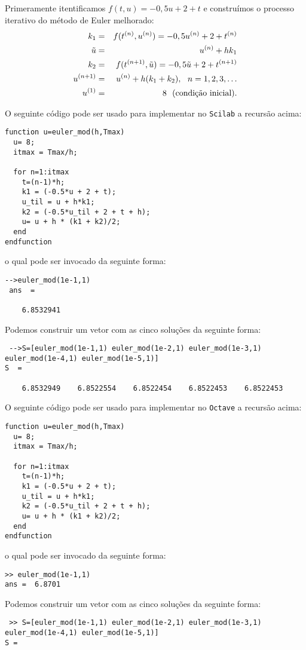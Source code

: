 \begin{resol} Primeramente itentificamos $f(t,u)=-0,5u+2+t$ e construímos o processo iterativo do método de Euler melhorado:
\begin{eqnarray}
  k_1&=&  f(t^{(n)},u^{(n)})=-0,5u^{(n)}+2+t^{(n)}\\
  \tilde{u}&=& u^{(n)} + hk_1\\
  k_2&=&  f(t^{(n+1)},\tilde{u})=-0,5\tilde{u}+2+t^{(n+1)}\\
  u^{(n+1)}&=&u^{(n)} + h( k_1+k_2),~~n=1,2,3,\ldots\\
  u^{(1)}&=&8 ~~ \hbox{\text{(condição inicial)}}.
\end{eqnarray}

\ifisscilab
O seguinte código pode ser usado para implementar no \verb+Scilab+ a recursão acima:
\begin{verbatim}
function u=euler_mod(h,Tmax)
  u= 8;
  itmax = Tmax/h;

  for n=1:itmax
    t=(n-1)*h;
    k1 = (-0.5*u + 2 + t);
    u_til = u + h*k1;
    k2 = (-0.5*u_til + 2 + t + h);
    u= u + h * (k1 + k2)/2;
  end
endfunction
\end{verbatim}
o qual pode ser invocado da seguinte forma:
\begin{verbatim}
-->euler_mod(1e-1,1)
 ans  =

    6.8532941
\end{verbatim}
Podemos construir um vetor com as cinco soluções da seguinte forma:
\begin{verbatim}
 -->S=[euler_mod(1e-1,1) euler_mod(1e-2,1) euler_mod(1e-3,1) euler_mod(1e-4,1) euler_mod(1e-5,1)]
S  =

    6.8532949    6.8522554    6.8522454    6.8522453    6.8522453
 \end{verbatim}
\fi
\ifisoctave
O seguinte código pode ser usado para implementar no \verb+Octave+ a recursão acima:
\begin{verbatim}
function u=euler_mod(h,Tmax)
  u= 8;
  itmax = Tmax/h;

  for n=1:itmax
    t=(n-1)*h;
    k1 = (-0.5*u + 2 + t);
    u_til = u + h*k1;
    k2 = (-0.5*u_til + 2 + t + h);
    u= u + h * (k1 + k2)/2;
  end
endfunction
\end{verbatim}
o qual pode ser invocado da seguinte forma:
\begin{verbatim}
>> euler_mod(1e-1,1)
ans =  6.8701
\end{verbatim}
Podemos construir um vetor com as cinco soluções da seguinte forma:
\begin{verbatim}
 >> S=[euler_mod(1e-1,1) euler_mod(1e-2,1) euler_mod(1e-3,1) euler_mod(1e-4,1) euler_mod(1e-5,1)]
S =


\end{verbatim}
\end{resol}
